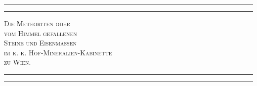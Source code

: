 \documentclass[a4paper, 11pt, oneside, polutonikogreek, german]{article}
\begin{document}
\frakfamily
\renewcommand{\contentsname}{
\frakfamily{Inhaltsverzeichnis}
}
\let\origcftsecfont\cft
\let\origcftsecpagefont\cftsecpagefont
\let\origcftsecafterpnum\cftsecafterpnum
\renewcommand{\cftsecpagefont}{\frakfamily{\origcftsecpagefont}}
\renewcommand{\cftsecafterpnum}{\frakfamily{\origcftsecafterpnum}}
\let\origcftsubsecpagefont\cftsubsecpagefont
\let\origcftsubsecafterpnum\cftsubsecafterpnum
\renewcommand{\cftsubsecpagefont}{\frakfamily{\origcftsubsecpagefont}}
\renewcommand{\cftsubsecafterpnum}{\frakfamily{\origcftsubsecafterpnum}}
\let\origcftsubsubsecpagefont\cftsubsubsecpagefont
\let\origcftsubsubsecafterpnum\cftsubsubsecafterpnum
\renewcommand{\cftsubsubsecpagefont}{\frakfamily{\origcftsubsubsecpagefont}}
\renewcommand{\cftsubsubsecafterpnum}{\frakfamily{\origcftsubsubsecafterpnum}}
\begin{titlepage} %
	\centering %

	
	\rule{\textwidth}{1.6pt}\vspace*{-\baselineskip}\vspace*{2pt} %
	\rule{\textwidth}{0.4pt} %
	
	\vspace{1\baselineskip} %
	
	{\scshape\Huge Die Meteoriten oder\\[1.25pt] vom Himmel gefallenen \\[1.25pt] Steine und Eisenmassen\\[1.25pt] im k. k. Hof-Mineralien-Kabinette\\[4pt] zu Wien.}
	
	\vspace{1\baselineskip} %

	\rule{\textwidth}{0.4pt}\vspace*{-\baselineskip}\vspace{3.2pt} %
	\rule{\textwidth}{1.6pt} %
	
	\vspace{1\baselineskip} %
	
	

\end{titlepage}
\end{document}

